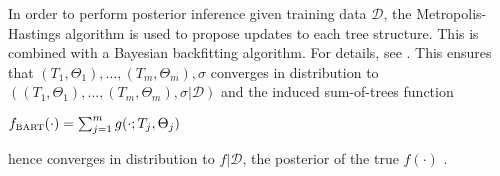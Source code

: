 

In order to perform posterior inference given training data $\mathcal{D}$, the Metropolis-Hastings algorithm is used to propose updates to each tree structure. This is combined with a Bayesian backfitting algorithm. For details, see \citet{BART}.
This ensures that $(T_1, \Theta_1), \ldots, (T_m, \Theta_m), \sigma$ converges in distribution to $((T_1, \Theta_{1}), \ldots, (T_m, \Theta_m), \sigma|\mathcal{D})$ and the induced sum-of-trees function 
\begin{center}
    $f_{\bart}(\cdot) = \sum_{j=1}^{m}g(\cdot; T_j, \Theta_j)$
\end{center}
hence converges in distribution to $f|\mathcal{D}$, the posterior of the true $f(\cdot)$ \cite{BART}.
